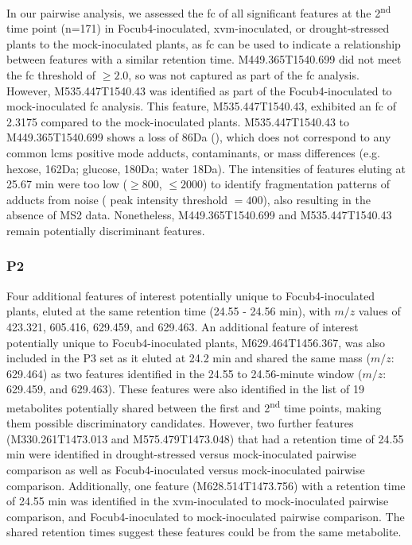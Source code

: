 In our pairwise analysis, we assessed the \acf{fc} of all significant features at the 2\textsuperscript{nd} time point (n=171) in \ac{Focub4}-inoculated, \ac{xvm}-inoculated, or drought-stressed plants to the mock-inoculated plants, as \ac{fc} can be used to indicate a relationship between features with a similar retention time. M449.365T1540.699 did not meet the \ac{fc} threshold of $\ge2.0$, so was not captured as part of the \ac{fc} analysis. However, M535.447T1540.43 was identified as part of the \ac{Focub4}-inoculated to mock-inoculated \ac{fc} analysis. This feature, M535.447T1540.43, exhibited an \ac{fc} of 2.3175 compared to the mock-inoculated plants. M535.447T1540.43 to M449.365T1540.699 shows a loss of 86Da (), which does not correspond to any common \ac{lcms} positive mode adducts, contaminants, or mass differences (e.g. hexose, 162Da; glucose, 180Da; water 18Da). The intensities of features eluting at 25.67 min were too low ($\geq800$, $\leq2000$) to identify fragmentation patterns of adducts from noise ( peak intensity threshold $=400$), also resulting in the absence of MS2 data. Nonetheless, M449.365T1540.699 and M535.447T1540.43 remain potentially discriminant features.

\subsubsection{P2}

Four additional features of interest potentially unique to \ac{Focub4}-inoculated plants, eluted at the same retention time (24.55 - 24.56 min), with $m/z$ values of 423.321, 605.416, 629.459, and 629.463. An additional feature of interest potentially unique to \ac{Focub4}-inoculated plants, M629.464T1456.367, was also included in the P3 set as it eluted at 24.2 min and shared the same mass ($m/z$: 629.464) as two features identified in the 24.55 to 24.56-minute window ($m/z$: 629.459, and 629.463). These features were also identified in the list of 19 metabolites potentially shared between the first and 2\textsuperscript{nd} time points, making them possible discriminatory candidates. However, two further features (M330.261T1473.013 and M575.479T1473.048) that had a retention time of 24.55 min were identified in drought-stressed versus mock-inoculated pairwise comparison as well as \ac{Focub4}-inoculated versus mock-inoculated pairwise comparison. Additionally, one feature (M628.514T1473.756) with a retention time of 24.55 min was identified in the \ac{xvm}-inoculated to mock-inoculated pairwise comparison, and \ac{Focub4}-inoculated to mock-inoculated pairwise comparison. The shared retention times suggest these features could be from the same metabolite.


